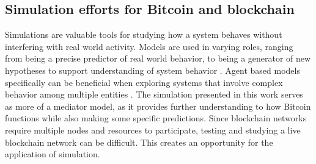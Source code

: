 \documentclass[12pt]{report}
\begin{document}

\subsection{Simulation efforts for Bitcoin and blockchain}
Simulations are valuable tools for studying how a system behaves without interfering with real world activity. Models are used in varying roles, ranging from being a precise predictor of real world behavior, to being a generator of new hypotheses to support understanding of system behavior \cite{Heath.2010}. Agent based models specifically can be beneficial when exploring systems that involve complex behavior among multiple entities \cite{Heath.2010}. The simulation presented in this work serves as more of a mediator model, as it provides further understanding to how Bitcoin functions while also making some specific predictions.%
Since blockchain networks require multiple nodes and resources to participate, testing and studying a live blockchain network can be difficult. This creates an opportunity for the application of simulation.
\end{document}
